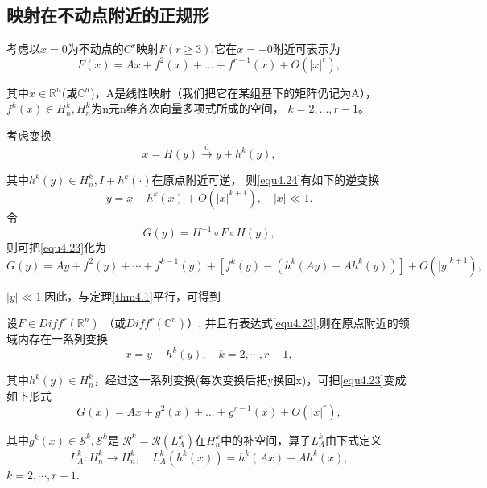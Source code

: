 \subsection{映射在不动点附近的正规形}
考虑以\(x=0\)为不动点的\(C^r\)映射$F ( r \geq 3 )$,它在\(x=-0\)附近可表示为
\begin{equation}
F ( x ) = A x + f ^ { 2 } ( x ) + \dots + f ^ { r - 1 } ( x ) + O \left( | x | ^ { r } \right),
  \label{eq:1.4.23}
\end{equation}

其中\(x\in \mathbb{R}^n\)(或\(\mathbb{C}^n\))，A是线性映射（我们把它在某组基下的矩阵仍记为A），$f ^ { k } ( x ) \in H _ { n  } ^ { k } , H _ {  n  } ^ { k }$为n元n维齐次向量多项式所成的空间，
$k = 2 , \dots , r - 1$。

考虑变换
\begin{equation}
x = H ( y ) \stackrel { \mathrm { d } } { \longrightarrow } y + h ^ { k } ( y ),
\label{eq:1.4.24}
\end{equation}

其中$h ^ { k } ( y ) \in H _ { n } ^ { k } , I + h ^ { k } ( \cdot )$在原点附近可逆，
则\ref{equ4.24}有如下的逆变换
\[
y = x - h ^ { k } ( x ) + O \left( | x | ^ { k + 1 } \right) , \quad | x | \ll 1.
\]
令
\[
G ( y ) = H ^ { - 1 } \circ F \circ H ( y ),
\]
则可把\ref{equ4.23}化为  
\[
  G ( y ) = A y + f ^ { 2 } ( y ) + \cdots + f ^ { k - 1 } ( y ) +
  \left[ f ^ { k } ( y ) - \left( h ^ { k } ( A y ) - A h ^ { k } ( y ) \right) \right] + O \left( | y | ^ { k + 1 } \right),
\]

$| y | \ll 1$.因此，与定理\ref{thm4.1}平行，可得到


\begin{theorem}
  设$F \in D i f f ^ { r } \left(\mathbb{ R} ^ { n } \right)$
  （或$Diff^ { r } \left( \mathbb { C } ^ { n } \right)$）,
  并且有表达式\ref{equ4.23},则在原点附近的领域内存在一系列变换
  \begin{equation}
x = y + h ^ { k } ( y ) , \quad k = 2 , \cdots , r - 1,
\label{eq:1.4.25}
  \end{equation}

  其中$h ^ { k } ( y ) \in H _ { n } ^ { k }$，经过这一系列变换(每次变换后把y换回x)，可把\ref{equ4.23}变成如下形式
  \begin{equation}
G ( x ) = A x + g ^ { 2 } ( x ) + \dots + g ^ { r - 1 } ( x ) + O \left( | x | ^ { r } \right),
    \label{eq:1.4.26}
\end{equation}

其中$g ^ { k } ( x ) \in \mathscr { S } ^ { k } , \mathscr{S}^k$是
$\mathscr { R } ^ { k } = \mathscr { R } \left( L _ { A } ^ { k } \right)$在\(H_n^k\)中的补空间，算子\(L_A^k\)由下式定义
\[
  L _ { A } ^ { k } : H _ { n } ^ { k } \rightarrow H _ { n } ^ { k },
  \quad
  L _ { A } ^ { k } \left( h ^ { k } ( x ) \right) = h ^ { k } ( A x ) - A h ^ { k } ( x ),
\]
$k = 2 , \cdots , r - 1$.
\end{theorem}

